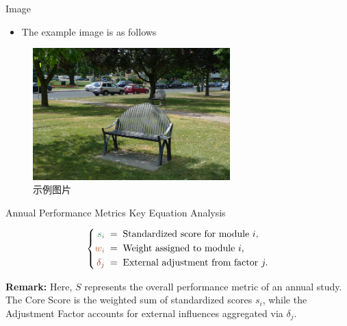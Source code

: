 \begin{frame}{Image}
  \begin{itemize}
    \item The example image is as follows
  \end{itemize}
  \begin{figure}
    \centering
    \includegraphics[width=0.68\textwidth]{image/demo.jpg}
    \caption{示例图片}
  \end{figure}
\end{frame}

\begin{frame}{Annual Performance Metrics}
  Key Equation Analysis

  \vspace{1em}

  \begin{center}
  \end{center}

  \vspace{1em}

  \[
    \left\{
    \begin{aligned}
      \textcolor{mygreen}{s_i} &\;=\; \text{Standardized score for module } i, \\
      \textcolor{myorange}{w_i} &\;=\; \text{Weight assigned to module } i, \\
      \textcolor{myred}{\delta_j} &\;=\; \text{External adjustment from factor } j.
    \end{aligned}
    \right.
  \]

  \vspace{1em}

  \textbf{Remark:} Here, \(S\) represents the overall performance metric of an annual study. The \textcolor{midblue}{Core Score} is the weighted sum of standardized scores \(s_i\), while the \textcolor{mypurple}{Adjustment Factor} accounts for external influences aggregated via \(\delta_j\).

\end{frame}


